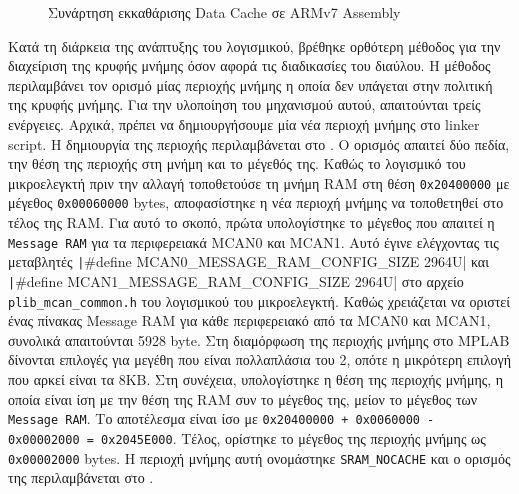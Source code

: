 \documentclass[a4paper,nobib,justified]{tufte-book}
\begin{document}
\begin{figure}
	\inputminted{asm}{code/examples/cache-clean-routine.asm}
	\label{algorithm:cache-clean-routine}
	\caption[Συνάρτηση εκκαθάρισης Data Cache]{Συνάρτηση εκκαθάρισης Data Cache σε ARMv7 Assembly}
\end{figure}

Κατά τη διάρκεια της ανάπτυξης του λογισμικού, βρέθηκε ορθότερη μέθοδος για την διαχείριση της κρυφής μνήμης όσον αφορά τις διαδικασίες του διαύλου. Η μέθοδος περιλαμβάνει τον ορισμό μίας περιοχής μνήμης η οποία δεν υπάγεται στην πολιτική της κρυφής μνήμης. Για την υλοποίηση του μηχανισμού αυτού, απαιτούνται τρείς ενέργειες. Αρχικά, πρέπει να δημιουργήσουμε μία νέα περιοχή μνήμης στο linker script. Η δημιουργία της περιοχής περιλαμβάνεται στο . Ο ορισμός απαιτεί δύο πεδία, την θέση της περιοχής στη μνήμη και το μέγεθός της. Καθώς το λογισμικό του μικροελεγκτή πριν την αλλαγή τοποθετούσε τη μνήμη RAM στη θέση \texttt{0x20400000} με μέγεθος \texttt{0x00060000} bytes, αποφασίστηκε η νέα περιοχή μνήμης να τοποθετηθεί στο τέλος της RAM. Για αυτό το σκοπό, πρώτα υπολογίστηκε το μέγεθος που απαιτεί η \texttt{Message RAM} για τα περιφερειακά MCAN0 και MCAN1. Αυτό έγινε ελέγχοντας τις μεταβλητές \texttt|#define MCAN0_MESSAGE_RAM_CONFIG_SIZE     2964U| και \texttt|#define MCAN1_MESSAGE_RAM_CONFIG_SIZE     2964U| στο αρχείο \texttt{plib\_mcan\_common.h} του λογισμικού του μικροελεγκτή. Καθώς χρειάζεται να οριστεί ένας πίνακας Message RAM για κάθε περιφερειακό από τα MCAN0 και MCAN1, συνολικά απαιτούνται 5928 byte. Στη διαμόρφωση της περιοχής μνήμης στο MPLAB δίνονται επιλογές για μεγέθη που είναι πολλαπλάσια του 2, οπότε η μικρότερη επιλογή που αρκεί είναι τα 8KB. Στη συνέχεια, υπολογίστηκε η θέση της περιοχής μνήμης, η οποία είναι ίση με την θέση της RAM συν το μέγεθος της, μείον το μέγεθος των \texttt{Message RAM}. Το αποτέλεσμα είναι ίσο με \texttt{0x20400000 + 0x0060000 - 0x00002000 = 0x2045E000}. Τέλος, ορίστηκε το μέγεθος της περιοχής μνήμης ως \texttt{0x00002000} bytes. Η περιοχή μνήμης αυτή ονομάστηκε \texttt{SRAM\_NOCACHE} και ο ορισμός της περιλαμβάνεται στο .

\end{document}
